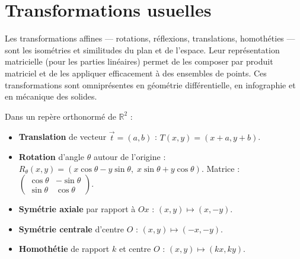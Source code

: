 \documentclass[11pt,a4paper,twoside]{book}
\newcommand{\R}{\mathbb{R}}
\begin{document}
\section{Transformations usuelles}

Les transformations affines — rotations, réflexions, translations, homothéties — sont les isométries et similitudes du plan et de l'espace. Leur représentation matricielle (pour les parties linéaires) permet de les composer par produit matriciel et de les appliquer efficacement à des ensembles de points. Ces transformations sont omniprésentes en géométrie différentielle, en infographie et en mécanique des solides.

\begin{definitionbox}
Dans un repère orthonormé de $\R^2$ :
\begin{itemize}
  \item \textbf{Translation} de vecteur $\vec{t}=(a,b)$ : $T(x,y)=(x+a,y+b)$.
  \item \textbf{Rotation} d'angle $\theta$ autour de l'origine : $R_\theta(x,y)=(x\cos\theta-y\sin\theta,\;x\sin\theta+y\cos\theta)$.
    Matrice : $\begin{pmatrix}\cos\theta&-\sin\theta\\\sin\theta&\cos\theta\end{pmatrix}$.
  \item \textbf{Symétrie axiale} par rapport à $Ox$ : $(x,y)\mapsto(x,-y)$.
  \item \textbf{Symétrie centrale} d'centre $O$ : $(x,y)\mapsto(-x,-y)$.
  \item \textbf{Homothétie} de rapport $k$ et centre $O$ : $(x,y)\mapsto(kx,ky)$.
\end{itemize}
\end{definitionbox}

\begin{center}
\end{center}
\end{document}
